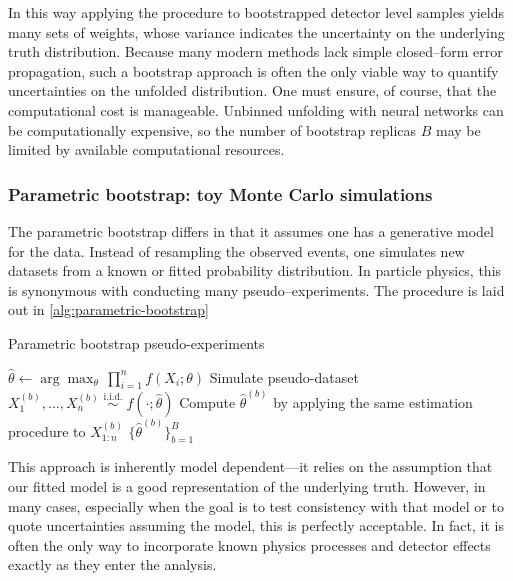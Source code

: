            In this way applying the procedure to bootstrapped detector level samples yields many sets of weights, whose variance indicates the uncertainty on the underlying truth distribution.
           Because many modern methods lack simple closed--form error propagation, such a bootstrap approach is often the only viable way to quantify uncertainties on the unfolded distribution.
           One must ensure, of course, that the computational cost is manageable.
           Unbinned unfolding with neural networks can be computationally expensive, so the number of bootstrap replicas $B$ may be limited by available computational resources.

        \subsubsection{Parametric bootstrap: toy Monte Carlo simulations}
            The parametric bootstrap differs in that it assumes one has a generative model for the data.
            Instead of resampling the observed events, one simulates new datasets from a known or fitted probability distribution.
            In particle physics, this is synonymous with conducting many pseudo--experiments.
            The procedure is laid out in \cref{alg:parametric-bootstrap}
            \begin{algorithm}
                \caption{Parametric bootstrap pseudo-experiments}
                \label{alg:parametric-bootstrap}
                
                \State $\hat\theta \leftarrow \displaystyle\arg\max_{\theta}\,\prod_{i=1}^{n}f(X_{i};\theta)$
                  \State Simulate pseudo-dataset $X_{1}^{(b)},\dots,X_{n}^{(b)}\;\overset{\text{i.i.d.}}{\sim}\;f(\cdot;\hat\theta)$
                  \State Compute $\hat\theta^{(b)}$ by applying the same estimation procedure to $X_{1:n}^{(b)}$
                \EndFor
                \State \Return $\{\hat\theta^{(b)}\}_{b=1}^{B}$
              \end{algorithm}
            This approach is inherently model dependent---it relies on the assumption that our fitted model is a good representation of the underlying truth.
            However, in many cases, especially when the goal is to test consistency with that model or to quote uncertainties assuming the model, this is perfectly acceptable.
            In fact, it is often the only way to incorporate known physics processes and detector effects exactly as they enter the analysis.

